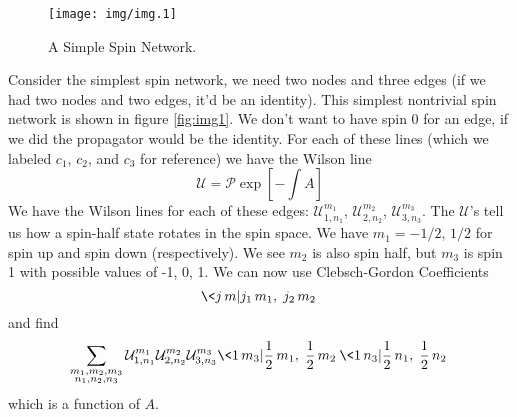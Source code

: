 
\begin{figure}[h]
\begin{center}
  \texttt{[image: img/img.1]}
\end{center}
\caption{A Simple Spin Network.}\label{fig:img1}
\end{figure}

Consider the simplest spin network, we need two nodes and three
edges (if we had two nodes and two edges, it'd be an
identity). This simplest nontrivial spin network is shown in
figure \eqref{fig:img1}. We don't want to have spin 0 for an
edge, if we did the propagator would be the identity. For each of
these lines (which we labeled $c_1$, $c_2$, and $c_3$ for
reference) we have the Wilson line 
\begin{equation}
\mathcal{U}=\mathcal{P}\exp\left[-\int A\right]
\end{equation}
We have the Wilson lines for each of these edges:
$\mathcal{U}^{m_{1}}_{1,n_{1}}$,
$\mathcal{U}^{m_{2}}_{2,n_{2}}$,
$\mathcal{U}^{m_{3}}_{3,n_{3}}$. The $\mathcal{U}$'s tell us
how a spin-half state rotates in the spin space. We have
$m_{1}=-1/2$, $1/2$ for spin up and spin down (respectively). We
see $m_{2}$ is also spin half, but $m_{3}$ is spin 1 with
possible values of -1, 0, 1. We can now use Clebsch-Gordon
Coefficients
\begin{equation}
\< j\,m|j_{1}\,m_{1},\; j_{2}\,m_{2}\>
\end{equation}
and find
\begin{equation}
\sum_{\substack{ m_1, m_2, m_3\\
n_1, n_2, n_3}} \mathcal{U}^{m_{1}}_{1,n_{1}}\mathcal{U}^{m_{2}}_{2,n_{2}}\mathcal{U}^{m_{3}}_{3,n_{3}}\<1\,m_{3}|\frac{1}{2}\,m_{1},\;\frac{1}{2}\,m_{2}\>\<1\,n_{3}|\frac{1}{2}\,n_{1},\;\frac{1}{2}\,n_{2}\>
\end{equation}
which is a function of $A$.

